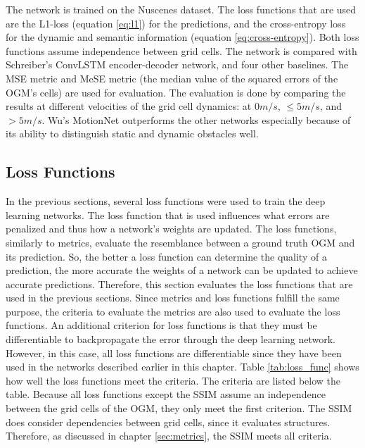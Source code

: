 The network is trained on the Nuscenes \cite{caesar2020nuscenes} dataset. The loss functions that are used are the L1-loss (equation \ref{eq:l1}) for the predictions, and the cross-entropy loss for the dynamic and semantic information (equation \ref{eq:cross-entropy}). Both loss functions assume independence between grid cells. The network is compared with Schreiber's \cite{schreiber2019long} \gls{ConvLSTM} encoder-decoder network, and four other baselines. The \gls{MSE} metric and \gls{MeSE} metric (the median value of the squared errors of the \gls{OGM}'s cells) are used for evaluation. The evaluation is done by comparing the results at different velocities of the grid cell dynamics: at $0 m/s$, $\leq 5 m/s$, and $> 5 m/s$. Wu's \cite{wu2020motionnet} MotionNet outperforms the other networks especially because of its ability to distinguish static and dynamic obstacles well.  

\subsection{Loss Functions} \label{subsec:lossfunc}
In the previous sections, several loss functions were used to train the deep learning networks. The loss function that is used influences what errors are penalized and thus how a network's weights are updated. The loss functions, similarly to metrics, evaluate the resemblance between a ground truth \gls{OGM} and its prediction. So, the better a loss function can determine the quality of a prediction, the more accurate the weights of a network can be updated to achieve accurate predictions. Therefore, this section evaluates the loss functions that are used in the previous sections. Since metrics and loss functions fulfill the same purpose, the criteria to evaluate the metrics are also used to evaluate the loss functions. An additional criterion for loss functions is that they must be differentiable to backpropagate the error through the deep learning network. However, in this case, all loss functions are differentiable since they have been used in the networks described earlier in this chapter. Table \ref{tab:loss_func} shows how well the loss functions meet the criteria. The criteria are listed below the table. Because all loss functions except the \gls{SSIM} assume an independence between the grid cells of the \gls{OGM}, they only meet the first criterion. The \gls{SSIM} does consider dependencies between grid cells, since it evaluates structures. Therefore, as discussed in chapter \ref{sec:metrics}, the \gls{SSIM} meets all criteria. 

